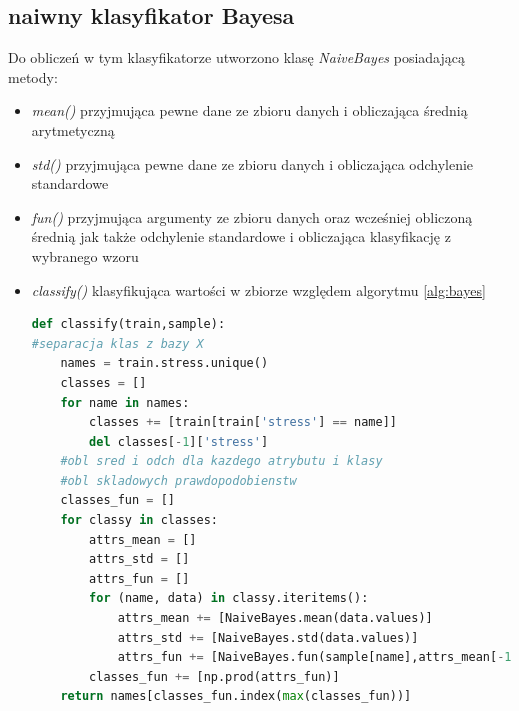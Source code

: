 \documentclass[12pt,a4paper]{article}
\begin{document}
        \subsection{naiwny klasyfikator Bayesa}
            Do obliczeń w tym klasyfikatorze utworzono klasę \textit{NaiveBayes} posiadającą metody:
           \begin{itemize}
               \item \textit{mean()} przyjmująca pewne dane ze zbioru danych i obliczająca średnią arytmetyczną
               \item \textit{std()} przyjmująca pewne dane ze zbioru danych i obliczająca odchylenie standardowe
               \item \textit{fun()} przyjmująca argumenty ze zbioru danych oraz wcześniej obliczoną średnią jak także odchylenie standardowe i obliczająca klasyfikację z wybranego wzoru
               \item \textit{classify()} klasyfikująca wartości w zbiorze względem algorytmu \ref{alg:bayes}
               
                \begin{lstlisting}[language=Python, caption=metoda \textit{classify()} w Bayesie, label=lst:classify_B]
def classify(train,sample):
#separacja klas z bazy X
    names = train.stress.unique()
    classes = []
    for name in names:
        classes += [train[train['stress'] == name]]
        del classes[-1]['stress']
    #obl sred i odch dla kazdego atrybutu i klasy
    #obl skladowych prawdopodobienstw
    classes_fun = []
    for classy in classes:
        attrs_mean = []
        attrs_std = []
        attrs_fun = []
        for (name, data) in classy.iteritems():
            attrs_mean += [NaiveBayes.mean(data.values)]
            attrs_std += [NaiveBayes.std(data.values)]
            attrs_fun += [NaiveBayes.fun(sample[name],attrs_mean[-1],attrs_std[-1])]
        classes_fun += [np.prod(attrs_fun)]
    return names[classes_fun.index(max(classes_fun))]
                
                \end{lstlisting}
           \end{itemize}
            
        
\end{document}
